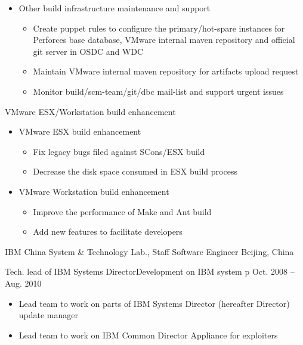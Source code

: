 \documentclass[10pt,letterpaper]{article}
\begin{document}
{{\begin{itemize}
        \item Other build infrastructure maintenance and support
            \begin{itemize}
                \item   Create puppet rules to configure the primary/hot-spare instances for
                    Perforces base database, VMware internal maven repository and official git
                    server in OSDC and WDC
                \item   Maintain VMware internal maven repository for artifacts upload request
                \item   Monitor build/scm-team/git/dbc mail-list and support urgent issues
            \end{itemize}

    \end{itemize}
}
\headedsubsection %
{VMware ESX/Workstation build enhancement} {}
{
    \begin{itemize}
        \item VMware ESX build enhancement
            \begin{itemize}
                \item   Fix legacy bugs filed against SCons/ESX build
                \item   Decrease the disk space consumed in ESX build process
            \end{itemize}
        \item VMware Workstation build enhancement
            \begin{itemize}
            \item   Improve the performance of Make and Ant build
            \item   Add new features to facilitate developers
            \end{itemize}
    \end{itemize}
}
}


\headedsection 
{IBM China System \& Technology Lab., Staff Software Engineer}
{Beijing, China} {

\headedsubsection %
{Tech. lead of IBM Systems Director\texttrademark Development on IBM system p}
{Oct. 2008 -- Aug. 2010}
{
    \begin{itemize}
        \item Lead team to work on parts of IBM Systems Director\texttrademark
            (hereafter Director) update manager
        \item Lead team to work on IBM Common Director Appliance for exploiters
    \end{itemize}
}
}
\end{document}
